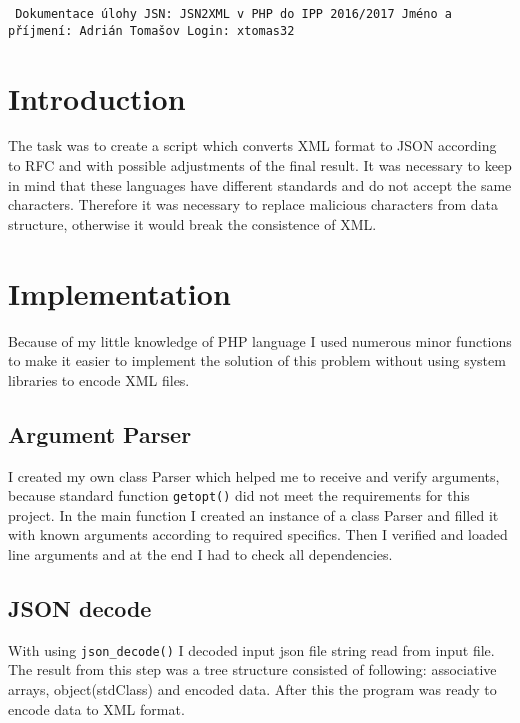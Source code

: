 \documentclass[a4paper, 10pt]{article}
\begin{document}
\begin{flushleft}

{\tt
\noindent Dokumentace úlohy JSN: JSN2XML v PHP do IPP 2016/2017 \linebreak
Jméno a příjmení: Adrián Tomašov \linebreak
Login: xtomas32 \linebreak
}
\end{flushleft}
\section{  Introduction}

The task was to create a script which converts XML format to JSON according to RFC and with possible adjustments of the
final result. It was necessary to keep in mind that these languages have different standards and do not accept the same
characters. Therefore it was necessary to replace malicious characters from data structure, otherwise it would break the
consistence of XML.


\section{Implementation}

Because of my little knowledge of PHP language I used numerous minor functions to make it easier to implement the solution of this problem without using system libraries to encode XML files.

\subsection{Argument Parser}

I created my own class Parser which helped me to receive and verify arguments, because standard function 
{\tt getopt()} 
did not meet the requirements for this project. In the main function I created an instance of a class Parser and filled it with known arguments according to required specifics. Then I verified and loaded line arguments and at the end I had to check all dependencies.

\subsection{JSON decode}

With using {\tt json\_decode()} I decoded input json file string read from input file. The result from this step was a tree structure consisted of following: associative arrays, object(stdClass) and encoded data. After this the program was ready to encode data to XML format.
\end{document}
